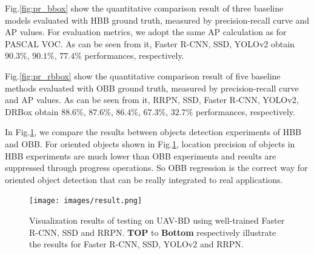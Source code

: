 Fig.\ref{fig:pr_bbox} show the quantitative comparison result of three baseline models evaluated with HBB ground truth, measured by precision-recall curve and AP values. For evaluation metrics, we adopt the same AP calculation as for PASCAL VOC. As can be seen from it, Faster R-CNN, SSD, YOLOv2 obtain $ 90.3\% $, $ 90.1\% $, $ 77.4\% $ performances, respectively.


Fig.\ref{fig:pr_rbbox} show the quantitative comparison result of five baseline methods evaluated with OBB ground truth, measured by precision-recall curve and AP values. As can be seen from it, RRPN, SSD, Faster R-CNN, YOLOv2, DRBox obtain $ 88.6\% $, $ 87.6\% $, $ 86.4\% $, $ 67.3\% $, $ 32.7\% $ performances, respectively.

In Fig.\ref{fig:result}, we compare the results between objects detection experiments of HBB and OBB. For oriented objects shown in Fig.\ref{fig:result}, location precision of objects in HBB 
experiments are much lower than OBB experiments and results are suppressed through progress operations. So OBB regression is the correct way for oriented object detection that can be really integrated to real applications.


\begin{figure}
	\texttt{[image: images/result.png]}
	\caption{Visualization results of testing on UAV-BD using well-trained Faster R-CNN, SSD and RRPN. \textbf{TOP} to \textbf{Bottom} respectively illustrate the results for Faster R-CNN, SSD, YOLOv2 and RRPN.}
	\label{fig:result}
\end{figure}


















